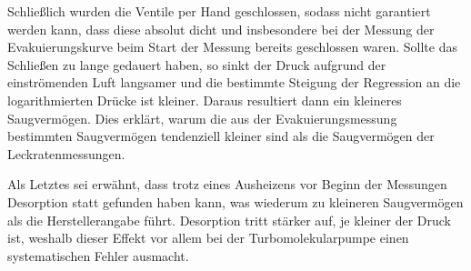 Schließlich wurden die Ventile per Hand geschlossen, sodass nicht garantiert
werden kann, dass diese absolut dicht und insbesondere bei der
Messung der Evakuierungskurve beim Start der Messung bereits geschlossen waren.
Sollte das Schließen zu lange gedauert haben, so sinkt der Druck aufgrund der
einströmenden Luft langsamer und die bestimmte Steigung der Regression an die
logarithmierten Drücke ist kleiner.
Daraus resultiert dann ein kleineres Saugvermögen. Dies erklärt, warum die
aus der Evakuierungsmessung bestimmten Saugvermögen tendenziell kleiner sind
als die Saugvermögen der Leckratenmessungen.

Als Letztes sei erwähnt, dass trotz eines Ausheizens vor Beginn der Messungen
Desorption statt gefunden haben kann, was wiederum zu kleineren Saugvermögen
als die Herstellerangabe führt. Desorption tritt stärker auf, je kleiner der
Druck ist, weshalb dieser Effekt vor allem bei der Turbomolekularpumpe einen
systematischen Fehler ausmacht.
